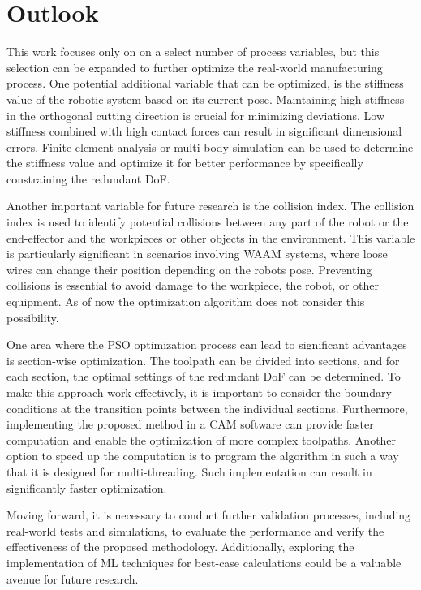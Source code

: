 \section{Outlook}\label{Outlook}

This work focuses only on on a select number of process variables, but this selection can be expanded to further optimize the real-world manufacturing process. One potential additional variable that can be optimized, is the stiffness value of the robotic system based on its current pose. Maintaining high stiffness in the orthogonal cutting direction is crucial for minimizing deviations. Low stiffness combined with high contact forces can result in significant dimensional errors. Finite-element analysis or multi-body simulation can be used to determine the stiffness value and optimize it for better performance by specifically constraining the redundant \acrshort{DoF}.

Another important variable for future research is the collision index. The collision index is used to identify potential collisions between any part of the robot or the end-effector and the workpieces or other objects in the environment. This variable is particularly significant in scenarios involving \acrshort{WAAM} systems, where loose wires can change their position depending on the robots pose. Preventing collisions is essential to avoid damage to the workpiece, the robot, or other equipment. As of now the optimization algorithm does not consider this possibility.

One area where the \acrshort{PSO} optimization process can lead to significant advantages is section-wise optimization. The toolpath can be divided into sections, and for each section, the optimal settings of the redundant \acrshort{DoF} can be determined. To make this approach work effectively, it is important to consider the boundary conditions at the transition points between the individual sections.
Furthermore, implementing the proposed method in a \acrshort{CAM} software can provide faster computation and enable the optimization of more complex toolpaths. Another option to speed up the computation is to program the algorithm in such a way that it is designed for multi-threading. Such implementation can result in significantly faster optimization.  

Moving forward, it is necessary to conduct further validation processes, including real-world tests and simulations, to evaluate the performance and verify the effectiveness of the proposed methodology. Additionally, exploring the implementation of \acrshort{ML} techniques for best-case calculations could be a valuable avenue for future research.

